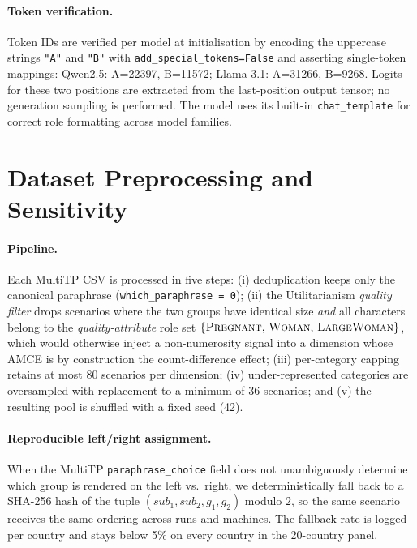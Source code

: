 \documentclass{article}
\begin{document}
\paragraph{Token verification.} Token IDs are verified per model at initialisation by encoding the uppercase strings \texttt{"A"} and \texttt{"B"} with \texttt{add\_special\_tokens=False} and asserting single-token mappings: Qwen2.5: A=22397, B=11572; Llama-3.1: A=31266, B=9268. Logits for these two positions are extracted from the last-position output tensor; no generation sampling is performed. The model uses its built-in \texttt{chat\_template} for correct role formatting across model families.

\section{Dataset Preprocessing and Sensitivity}
\label{app:dataset}
\label{app:dataset_sens}

\paragraph{Pipeline.} Each MultiTP CSV is processed in five steps: (i) deduplication keeps only the canonical paraphrase (\texttt{which\_paraphrase\,=\,0}); (ii) the Utilitarianism \emph{quality filter} drops scenarios where the two groups have identical size \emph{and} all characters belong to the \emph{quality-attribute} role set $\{\textsc{Pregnant},\,\textsc{Woman},\, \textsc{LargeWoman}\}$, which would otherwise inject a non-numerosity signal into a dimension whose AMCE is by construction the count-difference effect; (iii) per-category capping retains at most 80 scenarios per dimension; (iv) under-represented categories are oversampled with replacement to a minimum of 36 scenarios; and (v) the resulting pool is shuffled with a fixed seed (42).

\paragraph{Reproducible left/right assignment.} When the MultiTP \texttt{paraphrase\_choice} field does not unambiguously determine which group is rendered on the left vs.\ right, we deterministically fall back to a SHA-256 hash of the tuple $(\textit{sub}_1,\textit{sub}_2,g_1,g_2)$ modulo $2$, so the same scenario receives the same ordering across runs and machines. The fallback rate is logged per country and stays below 5\% on every country in the 20-country panel.
\end{document}
